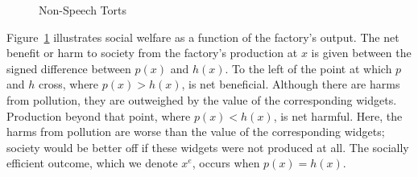 \begin{figure}[ht]
    \centering
{}
    \caption{Non-Speech Torts}
    \label{fig:factory}
\end{figure}


Figure~\ref{fig:factory} illustrates social welfare as a function of the factory's output. The net benefit or harm to society from the factory's production at $x$ is given between the signed difference between $p(x)$ and $h(x)$. To the left of the point at which $p$ and $h$ cross, where $p(x) > h(x)$, is net beneficial. Although there are harms from pollution, they are outweighed by the value of the corresponding widgets. Production beyond that point, where $p(x) < h(x)$, is net harmful. Here, the harms from pollution are worse than the value of the corresponding widgets; society would be better off if these widgets were not produced at all. The socially efficient outcome, which we denote $x^e$, occurs when $p(x) = h(x)$. 

